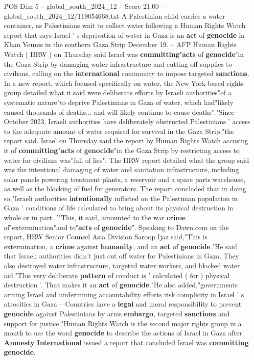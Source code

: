 \begin{textsample}{POS Dim 5 – global\_south\_2024\_12 – Score 21.00 – global\_south\_2024\_12/119054668.txt}  \label{ex:f5_pos_041}
A Palestinian child carries a water container, as Palestinians wait to collect water following a Human Rights Watch report that says Israel ' s deprivation of water in Gaza is an \textbf{act} of \textbf{genocide} in Khan Younis in the southern Gaza Strip December 19. -- AFP Human Rights Watch ( HRW ) on Thursday said Israel was \textbf{committing}"\textbf{acts} of \textbf{genocide}"in the Gaza Strip by damaging water infrastructure and cutting off supplies to civilians, calling on the \textbf{international} community to impose targeted \textbf{sanctions}.
In a new report, which focused specifically on water, the New York-based rights group detailed what it said were deliberate efforts by Israeli authorities"of a systematic nature"to deprive Palestinians in Gaza of water, which had"likely caused thousands of deaths... and will likely continue to cause deaths"."Since October 2023, Israeli authorities have deliberately obstructed Palestinians ' access to the adequate amount of water required for survival in the Gaza Strip,"the report said.
Israel on Thursday said the report by Human Rights Watch accusing it of \textbf{committing}"\textbf{acts} of \textbf{genocide}"in the Gaza Strip by restricting access to water for civilians was"full of lies".
The HRW report detailed what the group said was the intentional damaging of water and sanitation infrastructure, including solar panels powering treatment plants, a reservoir and a spare parts warehouse, as well as the blocking of fuel for generators.
The report concluded that in doing so,"Israeli authorities \textbf{intentionally} inflicted on the Palestinian population in Gaza ' conditions of life calculated to bring about its physical destruction in whole or in part. '"This, it said, amounted to the war \textbf{crime} of"extermination"and to"\textbf{acts} of \textbf{genocide}".
Speaking to Dawn.com on the report, HRW Senior Counsel Asia Division Saroop Ijaz said,"This is extermination, a \textbf{crime} against \textbf{humanity}, and an \textbf{act} of \textbf{genocide}."He said that Israeli authorities didn't just cut off water for Palestinians in Gaza.
They also destroyed water infrastructure, targeted water workers, and blocked water aid."This very deliberate \textbf{pattern} of conduct is ' calculated ( for ) physical destruction '.
That makes it an \textbf{act} of \textbf{genocide}."He also added,"governments arming Israel and undermining accountability efforts risk complicity in Israel ' s atrocities in Gaza -- Countries have a \textbf{legal} and moral responsibility to prevent \textbf{genocide} against Palestinians by arms \textbf{embargo}, targeted \textbf{sanctions} and support for justice."Human Rights Watch is the second major rights group in a month to use the word \textbf{genocide} to describe the actions of Israel in Gaza after \textbf{Amnesty} \textbf{International} issued a report that concluded Israel was \textbf{committing} \textbf{genocide}.

\end{textsample}
